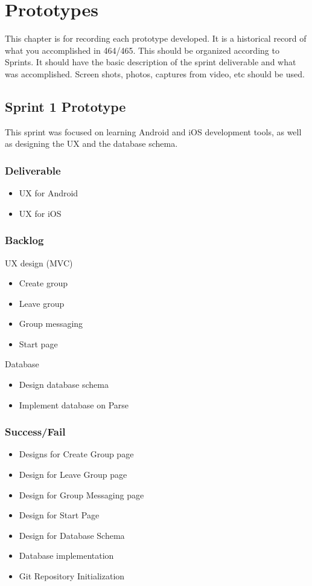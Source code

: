 

\chapter{Prototypes}

This chapter is for recording each prototype developed.  It is a historical record of what you accomplished in 464/465.   This should be organized according to Sprints.  It should have the basic description of the sprint deliverable and what was accomplished.  Screen shots, photos, captures from video, etc should be used.  

\section{Sprint 1 Prototype}
This sprint was focused on learning Android and iOS development tools, as well as designing the UX and the database schema.
\subsection{Deliverable}
	\begin{itemize}
		\item UX for Android
		\item UX for iOS
	\end{itemize}
\subsection{Backlog}
	\begin{itemize}
		UX design (MVC)
		\begin{itemize}
			\item Create group
			\item Leave group
			\item Group messaging
			\item Start page
		\end{itemize}
		Database
		\begin{itemize}
			\item Design database schema
			\item Implement database on Parse
		\end{itemize}
	\end{itemize}
\subsection{Success/Fail}
\begin{itemize}
	\item Designs for Create Group page
	\item Design for Leave Group page
	\item Design for Group Messaging page
	\item Design for Start Page
	\item Design for Database Schema
	\item Database implementation
	\item Git Repository Initialization
\end{itemize}

